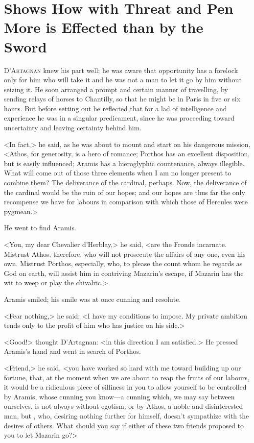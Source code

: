 \chapter[With Pen More is Effected than by Sword]{Shows How with Threat and Pen More is Effected than by the Sword}
	


 \lettrine{D}{'Artagnan} knew his part well; he was aware that opportunity has a forelock only for him who will take it and he was not a man to let it go by him without seizing it. He soon arranged a prompt and certain manner of travelling, by sending relays of horses to Chantilly, so that he might be in Paris in five or six hours. But before setting out he reflected that for a lad of intelligence and experience he was in a singular predicament, since he was proceeding toward uncertainty and leaving certainty behind him.

<In fact,> he said, as he was about to mount and start on his dangerous mission, <Athos, for generosity, is a hero of romance; Porthos has an excellent disposition, but is easily influenced; Aramis has a hieroglyphic countenance, always illegible. What will come out of those three elements when I am no longer present to combine them? The deliverance of the cardinal, perhaps. Now, the deliverance of the cardinal would be the ruin of our hopes; and our hopes are thus far the only recompense we have for labours in comparison with which those of Hercules were pygmean.>

He went to find Aramis.

<You, my dear Chevalier d'Herblay,> he said, <are the Fronde incarnate. Mistrust Athos, therefore, who will not prosecute the affairs of any one, even his own. Mistrust Porthos, especially, who, to please the count whom he regards as God on earth, will assist him in contriving Mazarin's escape, if Mazarin has the wit to weep or play the chivalric.>

Aramis smiled; his smile was at once cunning and resolute.

<Fear nothing,> he said; <I have my conditions to impose. My private ambition tends only to the profit of him who has justice on his side.>

<Good!> thought D'Artagnan: <in this direction I am satisfied.> He pressed Aramis's hand and went in search of Porthos.

<Friend,> he said, <you have worked so hard with me toward building up our fortune, that, at the moment when we are about to reap the fruits of our labours, it would be a ridiculous piece of silliness in you to allow yourself to be controlled by Aramis, whose cunning you know—a cunning which, we may say between ourselves, is not always without egotism; or by Athos, a noble and disinterested man, but , who, desiring nothing further for himself, doesn't sympathize with the desires of others. What should you say if either of these two friends proposed to you to let Mazarin go?>

